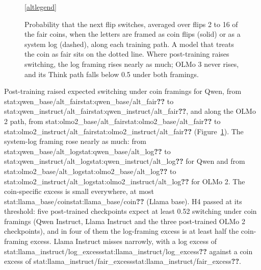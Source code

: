 \documentclass[11pt]{article}
\newcommand{\stat}[1]{\ifcsname stat:#1\endcsname\csname stat:#1\endcsname\else\textbf{??}\fi}
\begin{document}
\begin{figure}[t]

\vspace{2pt}
\ref{altlegend}
\caption{Probability that the next flip switches, averaged over flips 2 to 16 of the fair coins, when the letters are framed as coin flips (solid) or as a system log (dashed), along each training path. A model that treats the coin as fair sits on the dotted line. Where post-training raises switching, the log framing rises nearly as much; OLMo 3 never rises, and its Think path falls below 0.5 under both framings.}
\label{fig:switching}
\end{figure}

Post-training raised expected switching under coin framings for Qwen, from \stat{qwen_base/alt_fair} to \stat{qwen_instruct/alt_fair}, and along the OLMo 2 path, from \stat{olmo2_base/alt_fair} to \stat{olmo2_instruct/alt_fair} (Figure~\ref{fig:switching}). The system-log framing rose nearly as much: from \stat{qwen_base/alt_log} to \stat{qwen_instruct/alt_log} for Qwen and from \stat{olmo2_base/alt_log} to \stat{olmo2_instruct/alt_log} for OLMo 2. The coin-specific excess is small everywhere, at most \stat{llama_base/coin} (Llama base). H4 passed at its threshold: five post-trained checkpoints expect at least 0.52 switching under coin framings (Qwen Instruct, Llama Instruct and the three post-trained OLMo 2 checkpoints), and in four of them the log-framing excess is at least half the coin-framing excess. Llama Instruct misses narrowly, with a log excess of \stat{llama_instruct/log_excess} against a coin excess of \stat{llama_instruct/fair_excess}.
\end{document}
